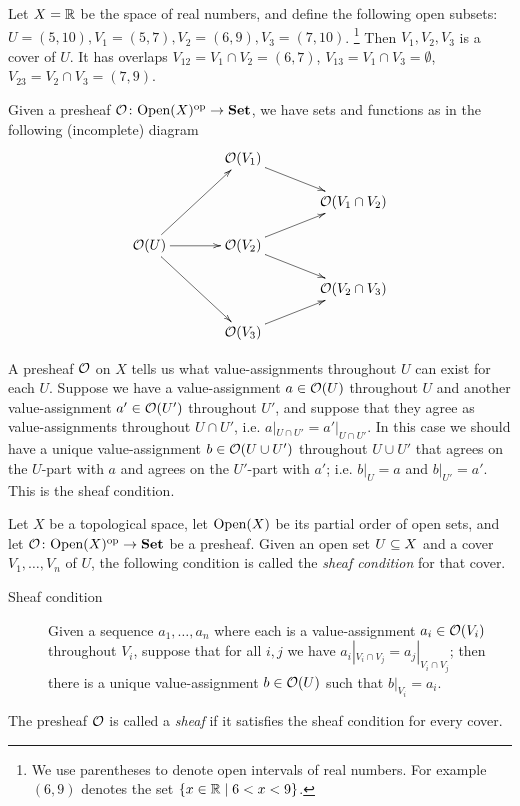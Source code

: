 \documentclass[CT4S-EN-RU]{subfiles}
\begin{document}
\begin{exampleENG}\label{ex:open cover}
Let $X=\RR$ be the space of real numbers, and define the following open subsets: $U=(5,10), V_1=(5,7), V_2=(6,9), V_3=(7,10)$.
\footnote{We use parentheses to denote open intervals of real numbers. For example $(6,9)$ denotes the set $\{x\in\RR\|6<x<9\}$.} 
Then $V_1, V_2, V_3$ is a cover of $U$. It has overlaps $V_{12}=V_1\cap V_2=(6,7)$, $V_{13}=V_1\cap V_3=\emptyset$, $V_{23}=V_2\cap V_3=(7,9)$. 

Given a presheaf $\mcO\taking\Op(X)\op\to\Set$, we have sets and functions as in the following (incomplete) diagram
$$
\xymatrix@=15pt{
&&\mcO(V_1)\ar[drr]\\
&&&&\mcO(V_1\cap V_2)\\
\mcO(U)\ar[uurr]\ar[rr]\ar[ddrr]&&\mcO(V_2)\ar[urr]\ar[drr]\\
&&&&\mcO(V_2\cap V_3)\\
&&\mcO(V_3)\ar[urr]
}
$$
\end{exampleENG}

\begin{exampleRUS}\label{ex:open cover}
\end{exampleRUS}

\begin{blockENG}
A presheaf $\mcO$ on $X$ tells us what value-assignments throughout $U$ can exist for each $U$. Suppose we have a value-assignment $a\in\mcO(U)$ throughout $U$ and another value-assignment $a'\in\mcO(U')$ throughout $U'$, and suppose that they agree as value-assignments throughout $U\cap U'$, i.e. $a|_{U\cap U'}=a'|_{U\cap U'}$. In this case we should have a unique value-assignment $b\in\mcO(U\cup U')$ throughout $U\cup U'$ that agrees on the $U$-part with $a$ and agrees on the $U'$-part with $a'$; i.e. $b|_U=a$ and $b|_{U'}=a'$. This is the sheaf condition. 
\end{blockENG}

\begin{blockRUS}
\end{blockRUS}

\begin{definitionENG}\label{def:sheaf}
Let $X$ be a topological space, let $\Op(X)$ be its partial order of open sets, and let $\mcO\taking\Op(X)\op\to\Set$ be a presheaf. Given an open set $U\ss X$ and a cover $V_1,\ldots, V_n$ of $U$, the following condition is called the {\em sheaf condition} for that cover. 
\begin{description}
\item [Sheaf condition] Given a sequence $a_1,\ldots,a_n$ where each is a value-assignment $a_i\in\mcO(V_i)$ throughout $V_i$, suppose that for all $i,j$ we have $a_i|_{V_i\cap V_j}=a_j|_{V_i\cap V_j}$; then there is a unique value-assignment $b\in\mcO(U)$ such that $b|_{V_i}=a_i$.
\end{description}
The presheaf $\mcO$ is called a {\em sheaf} if it satisfies the sheaf condition for every cover.
\end{definitionENG}
\end{document}

